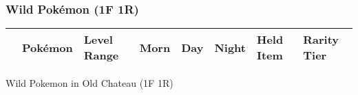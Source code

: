 \subsubsection{Wild Pokémon (1F 1R)}%
\label{ssubsec:WildPokmon(1F1R)}%
\begin{longtable}{||l l l l l l l l||}%
\hline%
\rowcolor{gray}%
&Pokémon&Level Range&Morn&Day&Night&Held Item&Rarity Tier\\%
\hline%
\endhead%
\hline%
\end{longtable}%
\caption{Wild Pokemon in Old Chateau (1F 1R)}